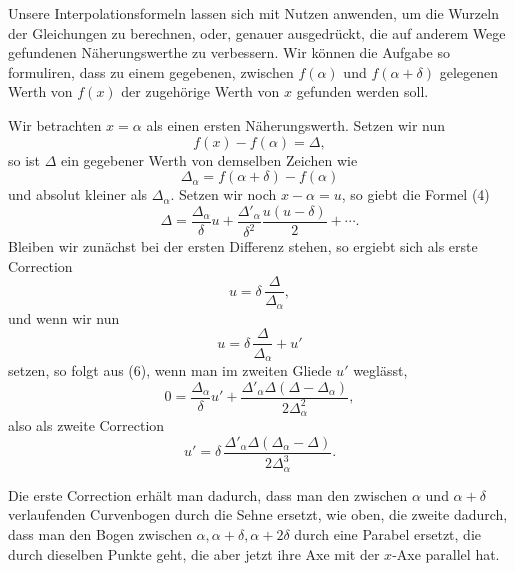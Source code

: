 \documentclass[11pt]{article}
\begin{document}
Unsere Interpolationsformeln lassen sich mit Nutzen anwenden, um die Wurzeln der Gleichungen zu berechnen, oder, genauer ausgedrückt, die auf anderem Wege gefundenen Näherungswerthe zu verbessern. Wir können die Aufgabe so formuliren, dass zu einem gegebenen, zwischen $f(\alpha)$ und $f(\alpha+\delta)$ gelegenen Werth von $f(x)$ der zugehörige Werth von $x$ gefunden werden soll.

Wir betrachten $x=\alpha$ als einen ersten Näherungswerth. Setzen wir nun
\[
        f(x)-f(\alpha)=\Delta,
\]
so ist $\Delta$ ein gegebener Werth von demselben Zeichen wie
\[
        \Delta_\alpha=f(\alpha+\delta)-f(\alpha)
\]
und absolut kleiner als $\Delta_\alpha$. Setzen wir noch $x-\alpha=u$, so giebt die Formel (4)
\begin{equation}
        \Delta=\frac{\Delta_\alpha}{\delta}u+
        \frac{\Delta'_\alpha}{\delta^2}\frac{u(u-\delta)}2+\cdots .
\tag{6}
\end{equation}
Bleiben wir zunächst bei der ersten Differenz stehen, so ergiebt sich als erste Correction
\begin{equation}
        u=\delta\,\frac{\Delta}{\Delta_\alpha},
\tag{7}
\end{equation}
und wenn wir nun
\[
        u=\delta\,\frac{\Delta}{\Delta_\alpha}+u'
\]
setzen, so folgt aus (6), wenn man im zweiten Gliede $u'$ weglässt,
\[
        0=\frac{\Delta_\alpha}{\delta}u'
        +\frac{\Delta'_\alpha\Delta(\Delta-\Delta_\alpha)}
               {2\Delta_\alpha^2},
\]
also als zweite Correction
\begin{equation}
        u'=\delta\,\frac{\Delta'_\alpha\Delta(\Delta_\alpha-\Delta)}
                     {2\Delta_\alpha^3}.
\tag{8}
\end{equation}

Die erste Correction erhält man dadurch, dass man den zwischen $\alpha$ und $\alpha+\delta$ verlaufenden Curvenbogen durch die Sehne ersetzt, wie oben, die zweite dadurch, dass man den Bogen zwischen $\alpha,\alpha+\delta,\alpha+2\delta$ durch eine Parabel ersetzt, die durch dieselben Punkte geht, die aber jetzt ihre Axe mit der $x$-Axe parallel hat.
\end{document}
